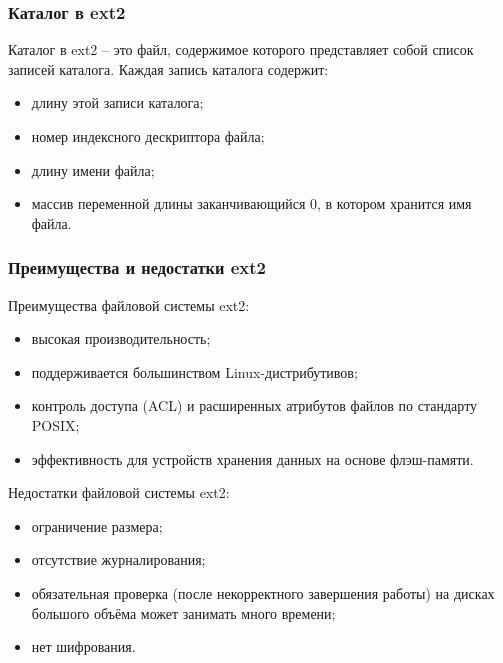 \subsubsection{Каталог в ext2}

Каталог в ext2 -- это файл, содержимое которого представляет собой список записей каталога.
Каждая запись каталога содержит:
\begin{itemize}
\item длину этой записи каталога;
\item номер индексного дескриптора файла;
\item длину имени файла;
\item массив переменной длины заканчивающийся 0, в котором хранится имя файла.
\end{itemize}

\subsubsection{Преимущества и недостатки ext2}

Преимущества файловой системы ext2:

\begin{itemize}
\item высокая производительность;
\item поддерживается большинством Linux-дистрибутивов;
\item контроль доступа (ACL) и расширенных атрибутов файлов по стандарту POSIX;
\item эффективность для устройств хранения данных на основе флэш-памяти.
\end{itemize}

Недостатки файловой системы ext2:

\begin{itemize}
\item ограничение размера;
\item отсутствие журналирования;
\item обязательная проверка (после некорректного завершения работы) на дисках большого объёма может занимать много времени;
\item нет шифрования.
\end{itemize}